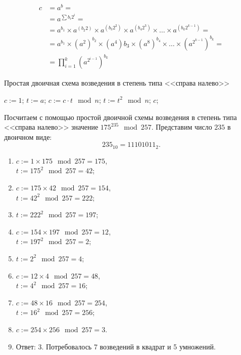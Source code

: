 \[\begin{array}{ll}
c & = a^b = \\
  & = a^{\sum b_i 2^i} = \\
  & = a^{b_1} \times a^{(b_2 2)} \times a^{(b_3 2^2)} \times a^{(b_4 2^3)} \times \dots \times a^{(b_k 2^{k-1})} = \\
  & = a^{b_1} \times \left(a^2\right)^{b_2} \times \left(a^4\right){b_3} \times \left(a^8\right)^{b_4} \times \dots \times \left(a^{2^{k-1}}\right)^{b_k} = \\
  & = \prod\limits_{i=1}^{k} \left(a^{2^{i-1}}\right)^{b_k}
\end{array}\]

\begin{algorithm}[iht]
	\caption{Простая двоичная схема возведения в степень типа <<справа налево>>\label{alg:power-mod-right-to-left}}
	\begin{algorithmic}
		\STATE $c := 1$;
		\STATE $t := a$;
				\STATE $c := c \cdot t \mod n$;
			\ENDIF
			\STATE $t := t^2 \mod n$;
		\ENDFOR
		\RETURN $c$;
	\end{algorithmic}
\end{algorithm}

\example Посчитаем с помощью простой двоичной схемы возведения в степень типа <<справа налево>> значение $175^{235} \mod 257$. Представим число $235$ в двоичном виде:
\[ 235_{10} = 11101011_{2}.\]
\begin{enumerate}
	\item $ c := 1 \times 175 \mod 257 = 175$, \\
		$ t:= 175^2 \mod 257 = 42$;
	\item $ c := 175 \times 42 \mod 257 = 154$, \\
		$ t:= 42^2 \mod 257 = 222$;
	\item $ t:= 222^2 \mod 257 = 197$;
	\item $ c := 154 \times 197 \mod 257 = 12$, \\
		$ t:= 197^2 \mod 257 = 2$;
	\item $ t:= 2^2 \mod 257 = 4$;
	\item $ c := 12 \times 4 \mod 257 = 48$, \\
		$ t:= 4^2 \mod 257 = 16$;
	\item $ c := 48 \times 16 \mod 257 = 254$, \\
		$ t:= 16^2 \mod 257 = 256$;
	\item $ c := 254 \times 256 \mod 257 = 3$.
	\item Ответ: 3. Потребовалось 7 возведений в квадрат и 5 умножений.
\end{enumerate}
\exampleend




